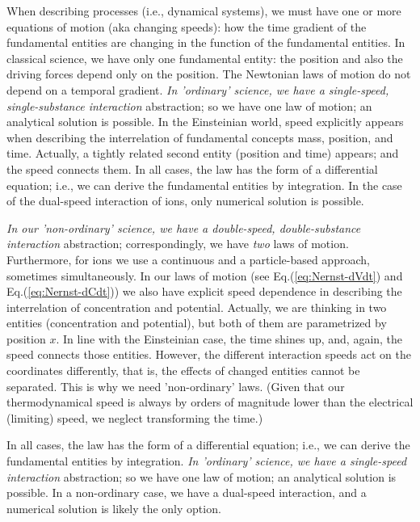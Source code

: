 When describing processes (i.e., dynamical systems), we must have
one or more equations of motion (aka changing speeds):
how the time gradient of the fundamental entities are changing in the function of the fundamental entities. In classical
science, we have only one fundamental entity: the position and also the driving
forces depend only on the position. The Newtonian laws of motion do not depend on a temporal gradient.
\textit{In 'ordinary' science, we have a single-speed, single-substance interaction} abstraction;
so we have one law of motion; an analytical solution is possible.
In the Einsteinian world, speed explicitly appears when describing
the interrelation of fundamental concepts mass, position, and time.
Actually, a tightly related second entity (position and time) appears;
and the speed connects them. 
In all cases, the law has the form of a differential equation;
i.e., we can derive the fundamental entities by integration.
In the case of the dual-speed interaction of ions,  
only numerical solution is possible.



\textit{In our 'non-ordinary' science,
	we have a double-speed, double-substance interaction} abstraction; correspondingly,
we have \textit{two} laws of motion. Furthermore, for ions we use
a continuous and a particle-based approach, sometimes simultaneously.
In our laws of motion (see Eq.(\ref{eq:Nernst-dVdt}) and Eq.(\ref{eq:Nernst-dCdt})) we also have explicit speed dependence 
in describing the interrelation of concentration and potential.
Actually, we are thinking in two entities (concentration and potential),
but both of them are parametrized by position $x$.
In line with the Einsteinian case, the time shines up, and,
again, the speed connects those entities.
However, the different interaction speeds act on the coordinates
differently, that is, the effects of changed entities cannot
be separated. This is why we need 'non-ordinary' laws. 
(Given that our thermodynamical speed is always by orders of magnitude lower
than the electrical (limiting) speed, we neglect transforming the time.)



In all cases, the law has the form of a differential equation;
i.e., we can derive the fundamental entities by integration.
\textit{In 'ordinary' science, we have a single-speed interaction} abstraction;
so we have one law of motion; an analytical solution is possible. 
In a non-ordinary case, we have a dual-speed interaction, and a numerical solution is likely the only option.

